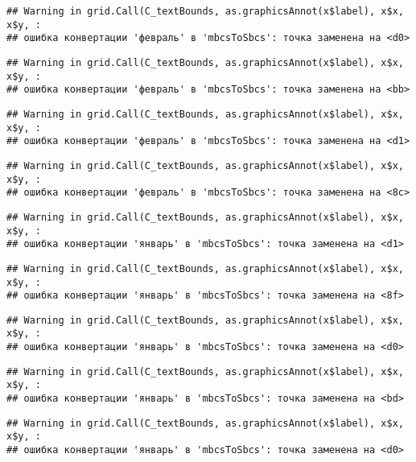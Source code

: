 \documentclass[
]{article}
\begin{document}
\begin{verbatim}
## Warning in grid.Call(C_textBounds, as.graphicsAnnot(x$label), x$x, x$y, :
## ошибка конвертации 'февраль' в 'mbcsToSbcs': точка заменена на <d0>
\end{verbatim}

\begin{verbatim}
## Warning in grid.Call(C_textBounds, as.graphicsAnnot(x$label), x$x, x$y, :
## ошибка конвертации 'февраль' в 'mbcsToSbcs': точка заменена на <bb>
\end{verbatim}

\begin{verbatim}
## Warning in grid.Call(C_textBounds, as.graphicsAnnot(x$label), x$x, x$y, :
## ошибка конвертации 'февраль' в 'mbcsToSbcs': точка заменена на <d1>
\end{verbatim}

\begin{verbatim}
## Warning in grid.Call(C_textBounds, as.graphicsAnnot(x$label), x$x, x$y, :
## ошибка конвертации 'февраль' в 'mbcsToSbcs': точка заменена на <8c>
\end{verbatim}

\begin{verbatim}
## Warning in grid.Call(C_textBounds, as.graphicsAnnot(x$label), x$x, x$y, :
## ошибка конвертации 'январь' в 'mbcsToSbcs': точка заменена на <d1>
\end{verbatim}

\begin{verbatim}
## Warning in grid.Call(C_textBounds, as.graphicsAnnot(x$label), x$x, x$y, :
## ошибка конвертации 'январь' в 'mbcsToSbcs': точка заменена на <8f>
\end{verbatim}

\begin{verbatim}
## Warning in grid.Call(C_textBounds, as.graphicsAnnot(x$label), x$x, x$y, :
## ошибка конвертации 'январь' в 'mbcsToSbcs': точка заменена на <d0>
\end{verbatim}

\begin{verbatim}
## Warning in grid.Call(C_textBounds, as.graphicsAnnot(x$label), x$x, x$y, :
## ошибка конвертации 'январь' в 'mbcsToSbcs': точка заменена на <bd>
\end{verbatim}

\begin{verbatim}
## Warning in grid.Call(C_textBounds, as.graphicsAnnot(x$label), x$x, x$y, :
## ошибка конвертации 'январь' в 'mbcsToSbcs': точка заменена на <d0>
\end{verbatim}
\end{document}
